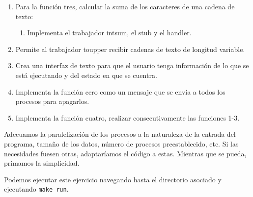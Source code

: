 \begin{enumerate}
    \item Para la función tres, calcular la suma de los caracteres de una cadena de texto:
    \begin{enumerate}
        \item Implementa el trabajador intsum, el stub y el handler.
    \end{enumerate}
    \item Permite al trabajador toupper recibir cadenas de texto de longitud variable.
    \item Crea una interfaz de texto para que el usuario tenga información de lo que se está ejecutando y del estado en que se cuentra.
    \item Implementa la función cero como un mensaje que se envía a todos los procesos para apagarlos.
    \item Implementa la función cuatro, realizar consecutivamente las funciones 1-3.
\end{enumerate}

Adecuamos la paralelización de los procesos a la naturaleza de la entrada del programa, tamaño de los datos, número de procesos preestablecido, etc. Si las necesidades fuesen otras, adaptaríamos el código
a estas. Mientras que se pueda, primamos la simplicidad.

Podemos ejecutar este ejercicio navegando hasta el directorio asociado y ejecutando \texttt{make run}.
